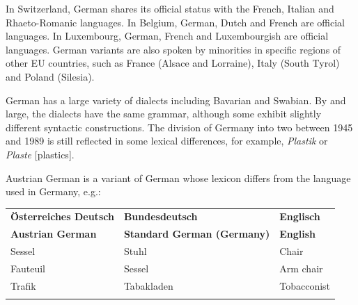 \documentclass[]{../../metanetpaper}
\begin{document}
\begin{Parallel}[c]{79mm}{78mm}
{In Switzerland, German shares its official status with the French, Italian and Rhaeto-Romanic languages. In Belgium, German, Dutch and French are official languages. In Luxembourg, German, French and Luxembourgish are official languages. German variants are also spoken by minorities in specific regions of other EU countries, such as France (Alsace and Lorraine), Italy (South Tyrol) and Poland (Silesia).

German has a large variety of dialects including Bavarian and Swabian. By and large, the dialects have the same grammar, although some exhibit slightly different syntactic constructions. The division of Germany into two between 1945 and 1989 is still reflected in some lexical differences, for example, \textit{Plastik} or \textit{Plaste} {[}plastics{]}.

Austrian German is a variant of German whose lexicon differs from the language used in Germany, e.g.:
  }
  \ParallelPar

  \begin{center}
  \setlength{\tabcolsep}{2em}
  \begin{tabulary}{150mm}{LLL} \toprule\addlinespace
    \textbf{Österreiches Deutsch} & \textbf{Bundesdeutsch} & \textbf{Englisch}\\ 
    \textbf{Austrian German} & \textbf{Standard German (Germany)} & \textbf{English}\\ \addlinespace\midrule\addlinespace
     Sessel   & Stuhl & Chair\\ \addlinespace
    Fauteuil & Sessel & Arm chair\\ \addlinespace
    Trafik   & Tabakladen & Tobacconist\\ \addlinespace\bottomrule
  \end{tabulary}
  \end{center}



\end{Parallel}
\end{document}

